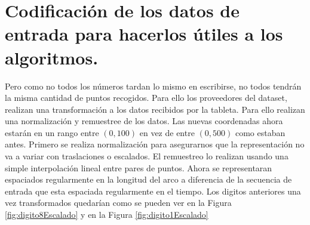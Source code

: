 \documentclass[12pt,a4paper]{article}
\begin{document}
\section{Codificación de los datos de entrada para hacerlos útiles a los algoritmos.}
Pero como no todos los números tardan lo mismo en escribirse, no todos tendrán la misma cantidad de puntos recogidos. Para ello los proveedores del dataset, realizan una transformación a los datos recibidos por la tableta. Para ello realizan una normalización y remuestree de los datos. Las nuevas coordenadas ahora estarán en un rango entre $(0,100)$ en vez de entre $(0,500)$ como estaban antes. Primero se realiza normalización para asegurarnos que la representación no va a variar con traslaciones o escalados. El remuestreo lo realizan usando una simple interpolación lineal  entre pares de puntos. Ahora se representaran espaciados regularmente en la longitud del arco a diferencia de la secuencia de entrada que esta espaciada regularmente en el tiempo. Los digitos anteriores una vez transformados quedarían como se pueden ver en la Figura \ref{fig:digito8Escalado} y en la Figura \ref{fig:digito1Escalado}
\end{document}
